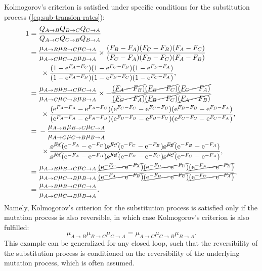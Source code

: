 Kolmogorov's criterion is satisfied under specific conditions for the substitution process (\ref{eq:sub-transion-rates}):
\begin{align}
    1 ={}& \dfrac{Q_{A \to B}Q_{B \to C}Q_{C \to A}}{Q_{A \to C}Q_{C \to B}Q_{B \to A}}\\
    ={}& \dfrac{\mu_{A \to B}\mu_{B \to C}\mu_{C \to A}}{\mu_{A \to C}\mu_{C \to B}\mu_{B \to A}} \times \dfrac{(F_{B} - F_{A})(F_{C} - F_{B})(F_{A} - F_{C})}{(F_{C} - F_{A})(F_{B} - F_{C})(F_{A} - F_{B})} \notag \\
    &\ \times \dfrac{( 1 - \text{e}^{F_{A} - F_{C}} )( 1 - \text{e}^{F_{C} - F_{B}} )( 1 - \text{e}^{F_{B} - F_{A}} )}{( 1 - \text{e}^{F_{A} - F_{B}} )( 1 - \text{e}^{F_{B} - F_{C}} )( 1 - \text{e}^{F_{C} - F_{A}} )}, \\
    ={}& \dfrac{\mu_{A \to B}\mu_{B \to C}\mu_{C \to A}}{\mu_{A \to C}\mu_{C \to B}\mu_{B \to A}} \times -\dfrac{\cancel{(F_{A} - F_{B})}\cancel{(F_{B} - F_{C})}\cancel{(F_{C} - F_{A})}}{\cancel{(F_{C} - F_{A})}\cancel{(F_{B} - F_{C})}\cancel{(F_{A} - F_{B})}} \notag \\
    &\ \times \dfrac{( \text{e}^{F_{A} - F_{A}} - \text{e}^{F_{A} - F_{C}} )( \text{e}^{F_{C} - F_{C}} - \text{e}^{F_{C} - F_{B}} )( \text{e}^{F_{B} - F_{B}} - \text{e}^{F_{B} - F_{A}} )}{( \text{e}^{F_{A} - F_{A}} - \text{e}^{F_{A} - F_{B}} )( \text{e}^{F_{B} - F_{B}} - \text{e}^{F_{B} - F_{C}} )( \text{e}^{F_{C} - F_{C}} - \text{e}^{F_{C} - F_{A}} )}, \\
    ={}& - \dfrac{\mu_{A \to B}\mu_{B \to C}\mu_{C \to A}}{\mu_{A \to C}\mu_{C \to B}\mu_{B \to A}} \notag \\
    &\ \times \dfrac{\cancel{\text{e}^{F_{A}}}( \text{e}^{-F_{A}} - \text{e}^{ - F_{C}} )\cancel{\text{e}^{F_{C}}}( \text{e}^{-F_{C}} - \text{e}^{ - F_{B}} )\cancel{\text{e}^{F_{B}}}( \text{e}^{-F_{B}} - \text{e}^{ - F_{A}} )}{\cancel{\text{e}^{F_{A}}}( \text{e}^{-F_{A}} - \text{e}^{ - F_{B}} )\cancel{\text{e}^{F_{B}}}( \text{e}^{-F_{B}} - \text{e}^{ - F_{C}} )\cancel{\text{e}^{F_{C}}}( \text{e}^{-F_{C}} - \text{e}^{ - F_{A}} )}, \\
    ={}& \dfrac{\mu_{A \to B}\mu_{B \to C}\mu_{C \to A}}{\mu_{A \to C}\mu_{C \to B}\mu_{B \to A}} \dfrac{\cancel{( \text{e}^{-F_{C}} - \text{e}^{ - F_{A}} )}\cancel{( \text{e}^{-F_{B}} - \text{e}^{ - F_{C}} )}\cancel{( \text{e}^{-F_{A}} - \text{e}^{ - F_{B}} )}}{\cancel{( \text{e}^{-F_{A}} - \text{e}^{ - F_{B}} )}\cancel{( \text{e}^{-F_{B}} - \text{e}^{ - F_{C}} )}\cancel{( \text{e}^{-F_{C}} - \text{e}^{ - F_{A}} )}}, \\
    ={}& \dfrac{\mu_{A \to B}\mu_{B \to C}\mu_{C \to A}}{\mu_{A \to C}\mu_{C \to B}\mu_{B \to A}}.
\end{align}
Namely, Kolmogorov's criterion for the substitution process is satisfied only if the mutation process is also reversible, in which case Kolmogorov's criterion is also fulfilled:
\begin{equation}
    \mu_{A \to B}\mu_{B \to C}\mu_{C \to A}=\mu_{A \to C}\mu_{C \to B}\mu_{B \to A}.
\end{equation}
This example can be generalized for any closed loop, such that the reversibility of the substitution process is conditioned on the reversibility of the underlying mutation process, which is often assumed.

